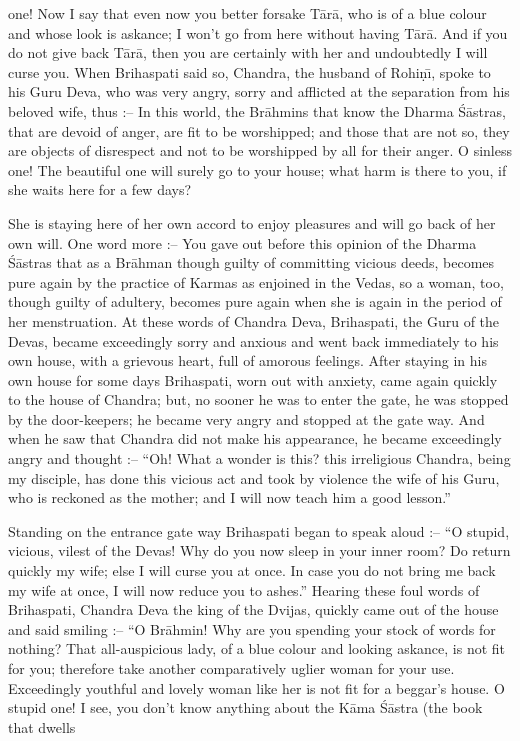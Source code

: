 one! Now I say that even now you better forsake T\=ar\=a, who is of a blue colour and whose look is askance; I won't go from here without having T\=ar\=a. And if you do not give back T\=ar\=a, then you are certainly with her and undoubtedly I will curse you. When Brihaspati said so, Chandra, the husband of Rohi\d{n}\={\i}, spoke to his Guru Deva, who was very angry, sorry and afflicted at the separation from his beloved wife, thus :-- In this world, the Br\=ahmins that know the Dharma \'S\=astras, that are devoid of anger, are fit to be worshipped; and those that are not so, they are objects of disrespect and not to be worshipped by all for their anger. O sinless one! The beautiful one will surely go to your house; what harm is there to you, if she waits here for a few days?

She is staying here of her own accord to enjoy pleasures and will go back of her own will. One word more :-- You gave out before this opinion of the Dharma \'S\=astras that as a Br\=ahman though guilty of committing vicious deeds, becomes pure again by the practice of Karmas as enjoined in the Vedas, so a woman, too, though guilty of adultery, becomes pure again when she is again in the period of her menstruation. At these words of Chandra Deva, Brihaspati, the Guru of the Devas, became exceedingly sorry and anxious and went back immediately to his own house, with a grievous heart, full of amorous feelings. After staying in his own house for some days Brihaspati, worn out with anxiety, came again quickly to the house of Chandra; but, no sooner he was to enter the gate, he was stopped by the door-keepers; he became very angry and stopped at the gate way. And when he saw that Chandra did not make his appearance, he became exceedingly angry and thought :-- ``Oh! What a wonder is this? this irreligious Chandra, being my disciple, has done this vicious act and took by violence the wife of his Guru, who is reckoned as the mother; and I will now teach him a good lesson.''

Standing on the entrance gate way Brihaspati began to speak aloud :-- ``O stupid, vicious, vilest of the Devas! Why do you now sleep in your inner room? Do return quickly my wife; else I will curse you at once. In case you do not bring me back my wife at once, I will now reduce you to ashes.'' Hearing these foul words of Brihaspati, Chandra Deva the king of the Dvijas, quickly came out of the house and said smiling :-- ``O Br\=ahmin! Why are you spending your stock of words for nothing? That all-auspicious lady, of a blue colour and looking askance, is not fit for you; therefore take another comparatively uglier woman for your use. Exceedingly youthful and lovely woman like her is not fit for a beggar's house. O stupid one! I see, you don't know anything about the K\=ama \'S\=astra (the book that dwells

